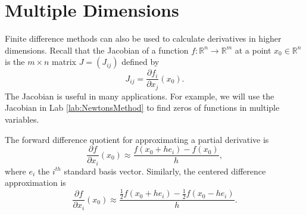 \section*{Multiple Dimensions}
Finite difference methods can also be used to calculate derivatives in higher dimensions.
Recall that the Jacobian of a function $f:\mathbb{R}^n \rightarrow \mathbb{R}^m$ at a point $x_0 \in \mathbb{R}^n$ is the $m \times n$ matrix $J = (J_{ij})$ defined by
\begin{equation*}
J_{ij} = \frac{\partial f_i}{\partial x_j}(x_0).
\end{equation*}
The Jacobian is useful in many applications.
For example, we will use the Jacobian in Lab \ref{lab:NewtonsMethod} to find zeros of functions in multiple variables.


The forward difference quotient for approximating a partial derivative is
\begin{equation*}
\frac{\partial f}{\partial x_i} (x_0) \approx \frac{f(x_0+h e_i)-f(x_0)}{h},
\end{equation*}
where $e_i$ the $i^{th}$ standard basis vector. 
Similarly, the centered difference approximation is
\begin{equation*}
\frac{\partial f}{\partial x_i} (x_0) \approx \frac{\frac{1}{2}f(x_0+h e_i)-\frac{1}{2}f(x_0-h e_i)}{h}.
\end{equation*}

